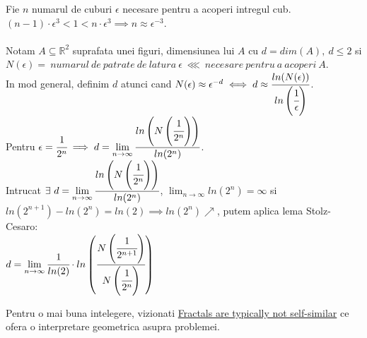 \documentclass{article}
\begin{document}
        Fie $n$ numarul de cuburi $\epsilon$ necesare pentru a acoperi intregul cub.\\
        $(n-1)\cdot\epsilon^3<1<n\cdot\epsilon^3 \implies n \approx \epsilon^{-3}$.\\ \\
        Notam $A \subseteq \mathbb{R}^2$ suprafata unei figuri, dimensiunea lui $A$ cu $d = dim(A),\ d \leq 2$ si $N(\epsilon) =\ numarul\ de\ patrate\ de\ latura\ \epsilon\ \lll\ necesare\ pentru\ a\ acoperi\ A$.\\
        In mod general, definim $d$ atunci cand $N(\epsilon) \approx \epsilon^{-d} \iff d \approx \cfrac{ln(N(\epsilon))}{ln\left(\cfrac{1}{\epsilon}\right)}$.\\
        
        Pentru $\epsilon=\cfrac{1}{2^n} \implies d = \displaystyle{\lim_{n\to\infty} \cfrac{ln\left(N\left(\cfrac{1}{2^n}\right)\right)}{ln(2^n)}}$.\\
        Intrucat $\exists\ d = \displaystyle{\lim_{n\to\infty} \cfrac{ln\left(N\left(\cfrac{1}{2^n}\right)\right)}{ln(2^n)}}$, $\displaystyle{\lim_{n\to\infty}ln(2^n)}=\infty$ si $ln(2^{n+1})-ln(2^n)=ln(2) \implies ln(2^n) \nearrow$, putem aplica lema Stolz-Cesaro:\\
        $d=\displaystyle{\lim_{n\to\infty}\cfrac{1}{ln(2)}\cdot ln\left(\cfrac{N\left(\cfrac{1}{2^{n+1}}\right)}{N\left(\cfrac{1}{2^n}\right)}\right)}$
    
        Pentru o mai buna intelegere, vizionati \href{https://www.youtube.com/watch?v=gB9n2gHsHN4}{Fractals are typically not self-similar} ce ofera o interpretare geometrica asupra problemei.
        
\end{document}
